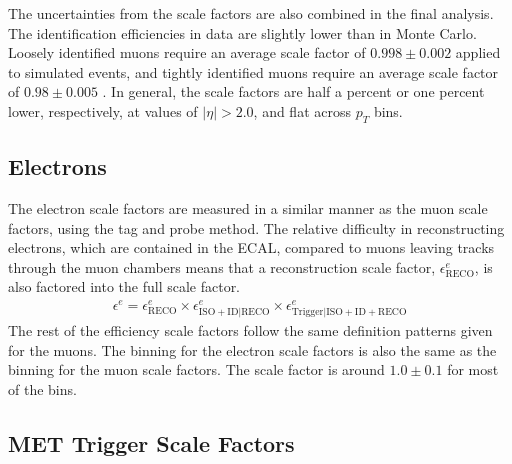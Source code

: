 The uncertainties from the scale factors are also combined in the final analysis.
The identification efficiencies in data are slightly lower than in Monte Carlo.
Loosely identified muons require an average scale factor of $0.998\pm0.002$ applied to simulated events,
and tightly identified muons require an average scale factor of $0.98\pm0.005$
\cite{CMS-DP-2019-022}.
In general, the scale factors are half a percent or one percent lower, respectively,
at values of $|\eta| > 2.0$, and flat across $p_T$ bins.

\subsection{Electrons}

The electron scale factors are measured in a similar manner as the muon scale factors,
using the tag and probe method.
The relative difficulty in reconstructing electrons, which are contained in the ECAL,
compared to muons leaving tracks through the muon chambers
means that a reconstruction scale factor, $\epsilon^e_\mathrm{RECO}$, is also factored into the full scale factor.
\begin{gather}
  \epsilon^e = \epsilon^e_\mathrm{RECO} \times \epsilon^e_\mathrm{ISO + ID|RECO} \times \epsilon^e_\mathrm{Trigger|ISO + ID + RECO}
\end{gather}
The rest of the efficiency scale factors follow the same definition patterns given for the muons.
The binning for the electron scale factors is also the same as the binning for the muon scale factors.
The scale factor is around $1.0 \pm 0.1$ for most of the bins.

\subsection{MET Trigger Scale Factors}


